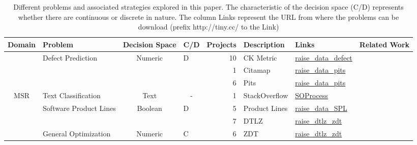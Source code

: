 \documentclass[table, xcdraw, sigconf,review, anonymous]{acmart}
\begin{document}

\begin{table}[]
\centering
\small
\caption{Different problems and associated strategies explored in this paper. The characteristic of the decision space (C/D) represents whether there are continuous or discrete in nature. The column Links represent the URL from where the problems can be download (prefix http://tiny.cc/ to the Link)}
\label{tbl:only1}
\begin{tabular}{@{}cp{3cm}cp{0.7cm}rp{3cm}lr@{}}
\toprule
\textbf{Domain} & \textbf{Problem} & \textbf{Decision Space} & \textbf{C/D} & \textbf{Projects} & \textbf{Description} & \textbf{Links} & \textbf{Related Work} \\ \midrule
 & Defect Prediction & Numeric & D & 10 & CK Metric & \href{http://tiny.cc/raise_data_defect}{raise\_data\_defect} & \cite{fu2016tuning} \\
 & \cellcolor[HTML]{EFEFEF} & \cellcolor[HTML]{EFEFEF} & \multicolumn{1}{c}{\cellcolor[HTML]{EFEFEF}} & \cellcolor[HTML]{EFEFEF}1 & \cellcolor[HTML]{EFEFEF}Citamap & \cellcolor[HTML]{EFEFEF}\href{http://tiny.cc/raise_data_pits}{raise\_data\_pits} & \cellcolor[HTML]{EFEFEF} \\
 & \cellcolor[HTML]{EFEFEF} & \cellcolor[HTML]{EFEFEF} & \multicolumn{1}{c}{\cellcolor[HTML]{EFEFEF}} & \cellcolor[HTML]{EFEFEF}6 & \cellcolor[HTML]{EFEFEF}Pits & \cellcolor[HTML]{EFEFEF}\href{http://tiny.cc/raise_data_pits}{raise\_data\_pits} & \cellcolor[HTML]{EFEFEF} \\
\multirow{-4}{*}{MSR} & \multirow{-3}{*}{\cellcolor[HTML]{EFEFEF}Text Classification} & \multirow{-3}{*}{\cellcolor[HTML]{EFEFEF}Text} & \multicolumn{1}{c}{\multirow{-3}{*}{\cellcolor[HTML]{EFEFEF}-}} & \cellcolor[HTML]{EFEFEF}1 & \cellcolor[HTML]{EFEFEF}StackOverflow & \cellcolor[HTML]{EFEFEF}\href{http://tiny.cc/SOProcess}{SOProcess} & \multirow{-3}{*}{\cellcolor[HTML]{EFEFEF}\cite{agrawalwrong}} \\ \midrule
 & Software Product Lines & Boolean & D & 5 & Product Lines & \href{http://tiny.cc/raise_data_SPL}{raise\_data\_SPL} & \cite{chen2017sampling} \\
 & \cellcolor[HTML]{EFEFEF} & \cellcolor[HTML]{EFEFEF} & \cellcolor[HTML]{EFEFEF} & \cellcolor[HTML]{EFEFEF}7 & \cellcolor[HTML]{EFEFEF}DTLZ & \cellcolor[HTML]{EFEFEF}\href{http://tiny.cc/raise_dtlz_zdt}{raise\_dtlz\_zdt} & \cellcolor[HTML]{EFEFEF} \\
 & \multirow{-2}{*}{\cellcolor[HTML]{EFEFEF}General Optimization} & \multirow{-2}{*}{\cellcolor[HTML]{EFEFEF}Numeric} & \multirow{-2}{*}{\cellcolor[HTML]{EFEFEF}C} & \cellcolor[HTML]{EFEFEF}6 & \cellcolor[HTML]{EFEFEF}ZDT & \cellcolor[HTML]{EFEFEF}\href{http://tiny.cc/raise_dtlz_zdt}{raise\_dtlz\_zdt} & \multirow{-2}{*}{\cellcolor[HTML]{EFEFEF}\cite{nair2016accidental}} \\

\end{tabular}
\end{table}
\end{document}
